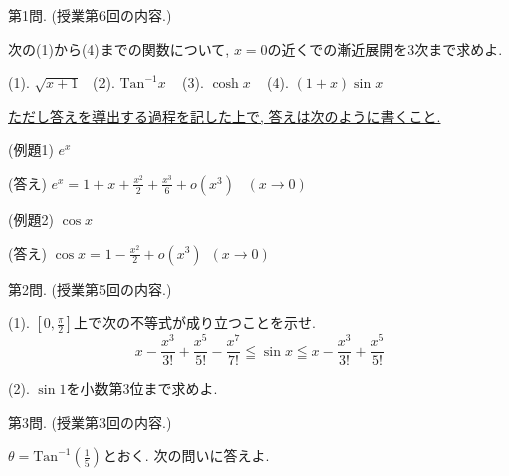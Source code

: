 \documentclass[dvipdfmx,a4paper,11pt]{article}
\newcommand{\Tan}{\text{Tan}^{-1}}
\theoremstyle{definition}
\begin{document}
{\Large 第1問.} (授業第6回の内容.)
\vspace{11pt}

次の(1)から(4)までの関数について, $x=0$の近くでの漸近展開を3次まで求めよ.


\vspace{11pt}

(1). $\sqrt{x+1}$\,\,\,
(2). $\Tan x$ \,\,\,
(3). $\cosh x$ \,\,\,
(4). $(1+ x) \sin x$

\vspace{11pt}

\underline{ただし答えを導出する過程を記した上で, 答えは次のように書くこと.}

\vspace{11pt}

(例題1) $e^x$ 

(答え) $e^x = 1 + x + \frac{x^2}{2} + \frac{x^3}{6}  + o(x^3)$\,\,\,
$(x \rightarrow 0)$


\vspace{11pt}

(例題2) $\cos x$

(答え) $\cos x= 1 - \frac{x^2}{2} + o(x^3)$\,\,\,$(x \rightarrow 0)$



 \vspace{33pt}
 
 {\Large 第2問.} (授業第5回の内容.)
 \vspace{11pt}
 
(1).
$[0, \frac{\pi}{2}]$上で次の不等式が成り立つことを示せ.
$$
x - \frac{x^3}{3!} + \frac{x^5}{5!} - \frac{x^7}{7!}
\leqq \sin x
\leqq  
x - \frac{x^3}{3!} + \frac{x^5}{5!}
$$

\vspace{11pt}

(2).
$\sin 1$を小数第3位まで求めよ.
  
   \vspace{33pt}
   
   {\Large 第3問.} (授業第3回の内容.)
    \vspace{11pt}
 
 $\theta = \Tan \left( \frac{1}{5} \right)$とおく.
 次の問いに答えよ.
 
\end{document}
